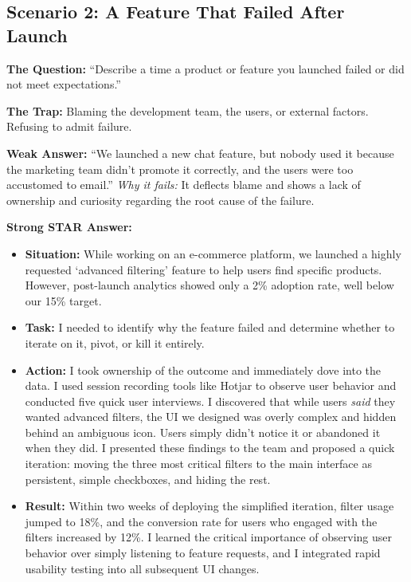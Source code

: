 \documentclass[
  11pt,
  openany,
  oneside]{book}
\providecommand{\tightlist}{%
  \setlength{\itemsep}{0pt}\setlength{\parskip}{0pt}}
\begin{document}
\subsection{Scenario 2: A Feature That Failed After
Launch}\label{scenario-2-a-feature-that-failed-after-launch}

\textbf{The Question:} ``Describe a time a product or feature you
launched failed or did not meet expectations.''

\textbf{The Trap:} Blaming the development team, the users, or external
factors. Refusing to admit failure.

\textbf{Weak Answer:} ``We launched a new chat feature, but nobody used
it because the marketing team didn't promote it correctly, and the users
were too accustomed to email.'' \emph{Why it fails:} It deflects blame
and shows a lack of ownership and curiosity regarding the root cause of
the failure.

\textbf{Strong STAR Answer:}

\begin{itemize}
\tightlist
\item
  \textbf{Situation:} While working on an e-commerce platform, we
  launched a highly requested `advanced filtering' feature to help users
  find specific products. However, post-launch analytics showed only a
  2\% adoption rate, well below our 15\% target.
\item
  \textbf{Task:} I needed to identify why the feature failed and
  determine whether to iterate on it, pivot, or kill it entirely.
\item
  \textbf{Action:} I took ownership of the outcome and immediately dove
  into the data. I used session recording tools like Hotjar to observe
  user behavior and conducted five quick user interviews. I discovered
  that while users \emph{said} they wanted advanced filters, the UI we
  designed was overly complex and hidden behind an ambiguous icon. Users
  simply didn't notice it or abandoned it when they did. I presented
  these findings to the team and proposed a quick iteration: moving the
  three most critical filters to the main interface as persistent,
  simple checkboxes, and hiding the rest.
\item
  \textbf{Result:} Within two weeks of deploying the simplified
  iteration, filter usage jumped to 18\%, and the conversion rate for
  users who engaged with the filters increased by 12\%. I learned the
  critical importance of observing user behavior over simply listening
  to feature requests, and I integrated rapid usability testing into all
  subsequent UI changes.
\end{itemize}
\end{document}
